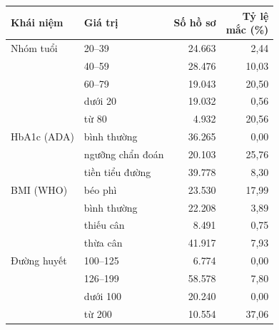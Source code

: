\begin{tabular}{llrr}
\toprule
Khái niệm & Giá trị & Số hồ sơ & \makecell[r]{Tỷ lệ\\mắc (\%)} \\
\midrule
Nhóm tuổi & 20–39 & 24{.}663 & 2{,}44 \\
 & 40–59 & 28{.}476 & 10{,}03 \\
 & 60–79 & 19{.}043 & 20{,}50 \\
 & dưới 20 & 19{.}032 & 0{,}56 \\
 & từ 80 & 4{.}932 & 20{,}56 \\
\midrule
HbA1c (ADA) & bình thường & 36{.}265 & 0{,}00 \\
 & ngưỡng chẩn đoán & 20{.}103 & 25{,}76 \\
 & tiền tiểu đường & 39{.}778 & 8{,}30 \\
\midrule
BMI (WHO) & béo phì & 23{.}530 & 17{,}99 \\
 & bình thường & 22{.}208 & 3{,}89 \\
 & thiếu cân & 8{.}491 & 0{,}75 \\
 & thừa cân & 41{.}917 & 7{,}93 \\
\midrule
Đường huyết & 100–125 & 6{.}774 & 0{,}00 \\
 & 126–199 & 58{.}578 & 7{,}80 \\
 & dưới 100 & 20{.}240 & 0{,}00 \\
 & từ 200 & 10{.}554 & 37{,}06 \\
\bottomrule
\end{tabular}
